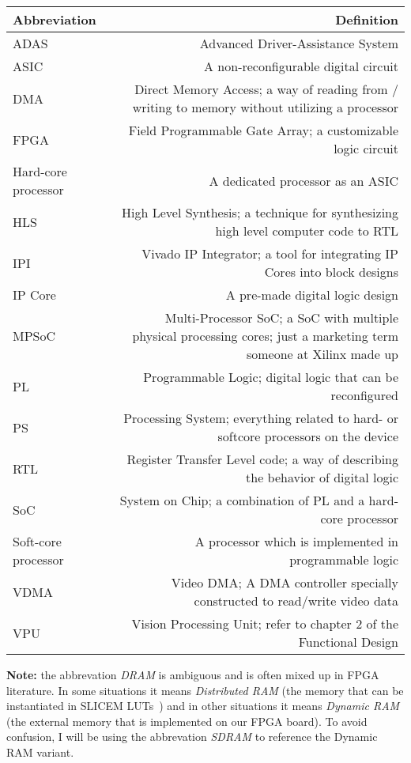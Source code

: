 \documentclass{matthijs}
\begin{document}

	\thispagestyle{empty}

	\begin{inhoudspagina}

		\clearpage

			\begin{tabular*}{\textwidth}{l @{\extracolsep{\fill}} R}
				\toprule

				\textbf{Abbreviation} & \textbf{Definition} \\
				\midrule

				ADAS & Advanced Driver-Assistance System \tabularnewline
				ASIC & A non-reconfigurable digital circuit \tabularnewline
				DMA & Direct Memory Access; a way of reading from / writing to memory without utilizing a processor \tabularnewline
				FPGA & Field Programmable Gate Array; a customizable logic circuit \tabularnewline
				Hard-core processor & A dedicated processor as an ASIC \tabularnewline
				HLS & High Level Synthesis; a technique for synthesizing high level computer code to RTL \tabularnewline
				IPI & Vivado IP Integrator; a tool for integrating IP Cores into block designs \tabularnewline
				IP Core & A pre-made digital logic design \tabularnewline
				MPSoC & Multi-Processor SoC; a SoC with multiple physical processing cores; just a marketing term someone at Xilinx made up \tabularnewline
				PL & Programmable Logic; digital logic that can be reconfigured \tabularnewline
				PS & Processing System; everything related to hard- or softcore processors on the device \tabularnewline
				RTL & Register Transfer Level code; a way of describing the behavior of digital logic \tabularnewline
				SoC & System on Chip; a combination of PL and a hard-core processor \tabularnewline
				Soft-core processor & A processor which is implemented in programmable logic \tabularnewline
				VDMA & Video DMA; A DMA controller specially constructed to read/write video data \tabularnewline
				VPU & Vision Processing Unit; refer to chapter 2 of the Functional Design \tabularnewline

				\bottomrule
			\end{tabular*}

		\vspace{3ex}

		\textbf{Note:} the abbrevation \textit{DRAM} is ambiguous and is often mixed up in FPGA literature.
		In some situations it means \textit{Distributed RAM} (the memory that can be instantiated in SLICEM LUTs~\cite{xilinxug474}) and in other situations it means \textit{Dynamic RAM} (the external memory that is implemented on our FPGA board).
		To avoid confusion, I will be using the abbrevation \textit{SDRAM} to reference the Dynamic RAM variant.

	\end{inhoudspagina}
\end{document}

